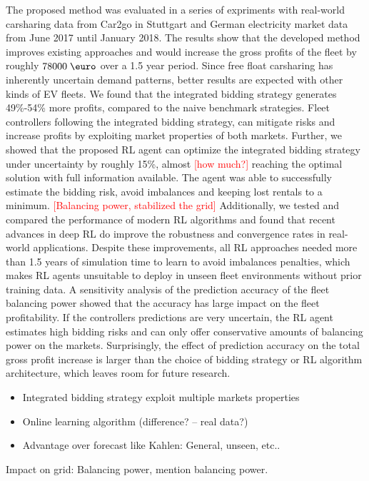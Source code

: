 \documentclass[a4paper, 12pt]{article}
\newcommand{\red}[1]{\textcolor{red}{[#1]}}
\begin{document}
The proposed method was evaluated in a series of expriments with real-world
carsharing data from Car2go in Stuttgart and German electricity market data from
June 2017 until January 2018. The results show that the developed method
improves existing approaches and would increase the gross profits of the fleet
by roughly \(78 000\; \eur\) over a 1.5 year period. Since free float carsharing
has inherently uncertain demand patterns, better results are expected with other
kinds of EV fleets. We found that the integrated bidding strategy generates
49\%-54\% more profits, compared to the naive benchmark strategies. Fleet
controllers following the integrated bidding strategy, can mitigate risks and
increase profits by exploiting market properties of both markets. Further, we
showed that the proposed RL agent can optimize the integrated bidding strategy
under uncertainty by roughly 15\%, almost \red{how much?} reaching the optimal
solution with full information available. The agent was able to successfully
estimate the bidding risk, avoid imbalances and keeping lost rentals to a
minimum. \red{Balancing power, stabilized the grid} Additionally, we tested and
compared the performance of modern RL algorithms and found that recent advances
in deep RL do improve the robustness and convergence rates in real-world
applications. Despite these improvements, all RL approaches needed more than 1.5
years of simulation time to learn to avoid imbalances penalties, which makes RL
agents unsuitable to deploy in unseen fleet environments without prior training
data. A sensitivity analysis of the prediction accuracy of the fleet balancing
power showed that the accuracy has large impact on the fleet profitability. If
the controllers predictions are very uncertain, the RL agent estimates high
bidding risks and can only offer conservative amounts of balancing power on the
markets. Surprisingly, the effect of prediction accuracy on the total gross
profit increase is larger than the choice of bidding strategy or RL algorithm
architecture, which leaves room for future research.


\begin{itemize}
\item Integrated bidding strategy exploit multiple markets properties
\item Online learning algorithm (difference? -- real data?)
\item Advantage over forecast like Kahlen: General, unseen, etc..
\end{itemize}


Impact on grid: Balancing power, mention balancing power.
\end{document}
